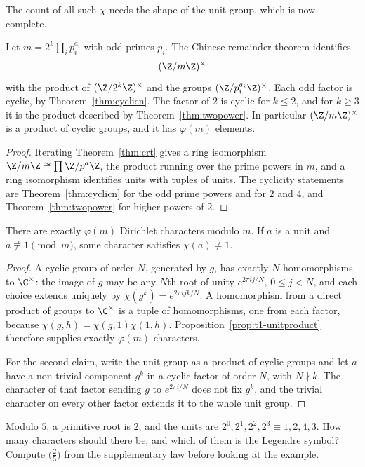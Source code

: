 The count of all such $\chi$ needs the shape of the unit group, which is now complete.

\begin{proposition}\label{prop:t1-unitproduct}
Let $m=2^k\prod_ip_i^{a_i}$ with odd primes $p_i$. The Chinese remainder theorem identifies
\[
(\Z/m\Z)^\times
\]
with the product of $(\Z/2^k\Z)^\times$ and the groups $(\Z/p_i^{a_i}\Z)^\times$. Each odd factor is cyclic, by Theorem~\ref{thm:cyclicn}. The factor of $2$ is cyclic for $k\le2$, and for $k\ge3$ it is the product described by Theorem~\ref{thm:twopower}. In particular $(\Z/m\Z)^\times$ is a product of cyclic groups, and it has $\varphi(m)$ elements.
\end{proposition}
\begin{proof}
Iterating Theorem~\ref{thm:crt} gives a ring isomorphism $\Z/m\Z\cong\prod\Z/p^{a}\Z$, the product running over the prime powers in $m$, and a ring isomorphism identifies units with tuples of units. The cyclicity statements are Theorem~\ref{thm:cyclicn} for the odd prime powers and for $2$ and $4$, and Theorem~\ref{thm:twopower} for higher powers of $2$.
\end{proof}

\begin{theorem}\label{thm:t1-charcount}
There are exactly $\varphi(m)$ Dirichlet characters modulo $m$. If $a$ is a unit and $a\not\equiv1\pmod m$, some character satisfies $\chi(a)\ne1$.
\end{theorem}
\begin{proof}
A cyclic group of order $N$, generated by $g$, has exactly $N$ homomorphisms to $\C^\times$: the image of $g$ may be any $N$th root of unity $e^{2\pi i j/N}$, $0\le j<N$, and each choice extends uniquely by $\chi(g^k)=e^{2\pi i jk/N}$. A homomorphism from a direct product of groups to $\C^\times$ is a tuple of homomorphisms, one from each factor, because $\chi(g,h)=\chi(g,1)\chi(1,h)$. Proposition~\ref{prop:t1-unitproduct} therefore supplies exactly $\varphi(m)$ characters.

For the second claim, write the unit group as a product of cyclic groups and let $a$ have a non-trivial component $g^k$ in a cyclic factor of order $N$, with $N\nmid k$. The character of that factor sending $g$ to $e^{2\pi i/N}$ does not fix $g^k$, and the trivial character on every other factor extends it to the whole unit group.
\end{proof}

\begin{think}
Modulo $5$, a primitive root is $2$, and the units are $2^0,2^1,2^2,2^3\equiv1,2,4,3$. How many characters should there be, and which of them is the Legendre symbol? Compute $\bigl(\frac2 5\bigr)$ from the supplementary law before looking at the example.
\end{think}

